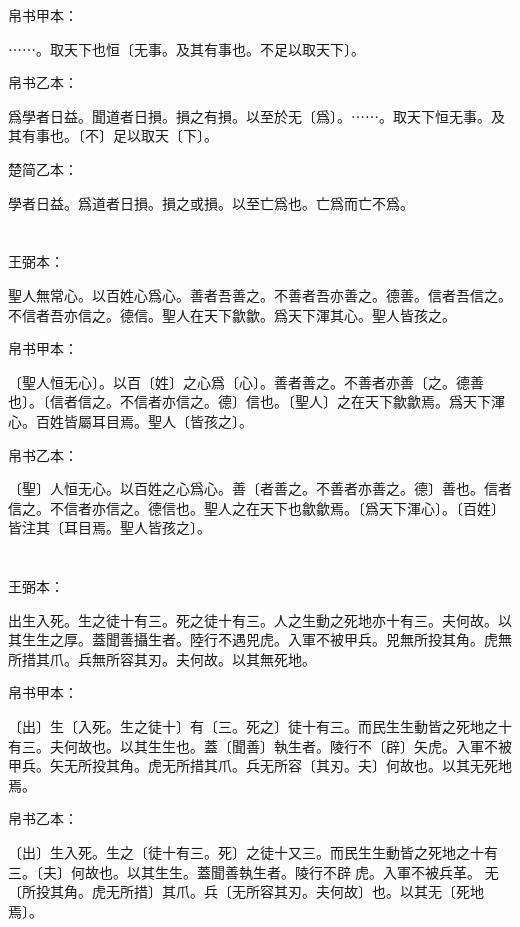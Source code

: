 \documentclass[a5paper]{ctexbook}
\begin{document}
    
    帛书甲本：

    ⋯⋯。取天下也恒〔无事。及其有事也。不足以取天下〕。

    帛书乙本：

    爲學者日益。聞道者日損。損之有損。以至於无〔爲〕。⋯⋯。取天下恒无事。及其有事也。〔不〕足以取天〔下〕。

    楚简乙本：

    學者日益。爲道者日損。損之或損。以至亡爲也。亡爲而亡不爲。

    \chapter{}
    王弼本：

    聖人無常心。以百姓心爲心。善者吾善之。不善者吾亦善之。德善。信者吾信之。不信者吾亦信之。德信。聖人在天下歙歙。爲天下渾其心。聖人皆孩之。

    
    帛书甲本：

    〔聖人恒无心〕。以百〔姓〕之心爲〔心〕。善者善之。不善者亦善〔之。德善也〕。〔信者信之。不信者亦信之。德〕信也。〔聖人〕之在天下歙歙焉。爲天下渾心。百姓皆屬耳目焉。聖人〔皆孩之〕。

    帛书乙本：

    〔聖〕人恒无心。以百姓之心爲心。善〔者善之。不善者亦善之。德〕善也。信者信之。不信者亦信之。德信也。聖人之在天下也歙歙焉。〔爲天下渾心〕。〔百姓〕皆注其〔耳目焉。聖人皆孩之〕。

    \chapter{}
    王弼本：

    出生入死。生之徒十有三。死之徒十有三。人之生動之死地亦十有三。夫何故。以其生生之厚。蓋聞善攝生者。陸行不遇兕虎。入軍不被甲兵。兕無所投其角。虎無所措其爪。兵無所容其刃。夫何故。以其無死地。

    
    帛书甲本：

    〔出〕生〔入死。生之徒十〕有〔三。死之〕徒十有三。而民生生動皆之死地之十有三。夫何故也。以其生生也。蓋〔聞善〕執生者。陵行不〔辟〕矢虎。入軍不被甲兵。矢无所投其角。虎无所措其爪。兵无所容〔其刃。夫〕何故也。以其无死地焉。

    帛书乙本：

    〔出〕生入死。生之〔徒十有三。死〕之徒十又三。而民生生動皆之死地之十有三。〔夫〕何故也。以其生生。蓋聞善執生者。陵行不辟𧰽虎。入軍不被兵革。𧰽无〔所投其角。虎无所措〕其爪。兵〔无所容其刃。夫何故〕也。以其无〔死地焉〕。
\end{document}
